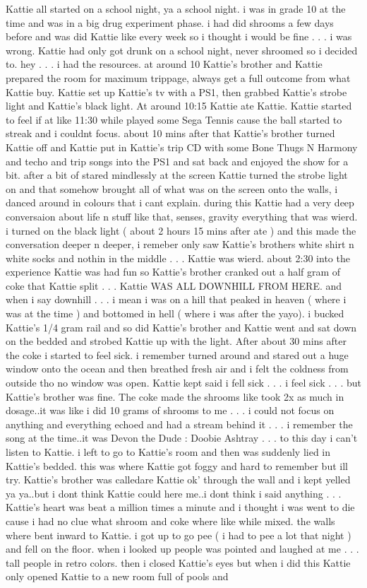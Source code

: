\documentclass[12pt]{book}
\begin{document}
Kattie all started on a school night, ya a school night. i was in grade 10 at the time and was in a big drug experiment phase. i had did shrooms a few days before and was did Kattie like every week so i thought i would be fine . . .  i was wrong. Kattie had only got drunk on a school night, never shroomed so i decided to. hey . . .  i had the resources. at around 10 Kattie's brother and Kattie prepared the room for maximum trippage, always get a full outcome from what Kattie buy. Kattie set up Kattie's tv with a PS1, then grabbed Kattie's strobe light and Kattie's black light. At around 10:15 Kattie ate Kattie. Kattie started to feel if at like 11:30 while played some Sega Tennis cause the ball started to streak and i couldnt focus. about 10 mins after that Kattie's brother turned Kattie off and Kattie put in Kattie's trip CD with some Bone Thugs N Harmony and techo and trip songs into the PS1 and sat back and enjoyed the show for a bit. after a bit of stared mindlessly at the screen Kattie turned the strobe light on and that somehow brought all of what was on the screen onto the walls, i danced around in colours that i cant explain. during this Kattie had a very deep conversaion about life n stuff like that, senses, gravity everything that was wierd. i turned on the black light ( about 2 hours 15 mins after ate ) and this made the conversation deeper n deeper, i remeber only saw Kattie's brothers white shirt n white socks and nothin in the middle . . .  Kattie was wierd. about 2:30 into the experience Kattie was had fun so Kattie's brother cranked out a half gram of coke that Kattie split . . .  Kattie WAS ALL DOWNHILL FROM HERE. and when i say downhill . . .  i mean i was on a hill that peaked in heaven ( where i was at the time ) and bottomed in hell ( where i was after the yayo). i bucked Kattie's 1/4 gram rail and so did Kattie's brother and Kattie went and sat down on the bedded and strobed Kattie up with the light. After about 30 mins after the coke i started to feel sick. i remember turned around and stared out a huge window onto the ocean and then breathed fresh air and i felt the coldness from outside tho no window was open. Kattie kept said i fell sick . . .  i feel sick . . .  but Kattie's brother was fine. The coke made the shrooms like took 2x as much in dosage..it was like i did 10 grams of shrooms to me . . .  i could not focus on anything and everything echoed and had a stream behind it . . .  i remember the song at the time..it was Devon the Dude : Doobie Ashtray . . .  to this day i can't listen to Kattie. i left to go to Kattie's room and then was suddenly lied in Kattie's bedded. this was where Kattie got foggy and hard to remember but ill try. Kattie's brother was calledare Kattie ok' through the wall and i kept yelled ya ya..but i dont think Kattie could here me..i dont think i said anything . . .  Kattie's heart was beat a million times a minute and i thought i was went to die cause i had no clue what shroom and coke where like while mixed. the walls where bent inward to Kattie. i got up to go pee (  i had to pee a lot that night  ) and fell on the floor. when i looked up people was pointed and laughed at me . . .  tall people in retro colors. then i closed Kattie's eyes but when i did this Kattie only opened Kattie to a new room full of pools and 
\end{document}
